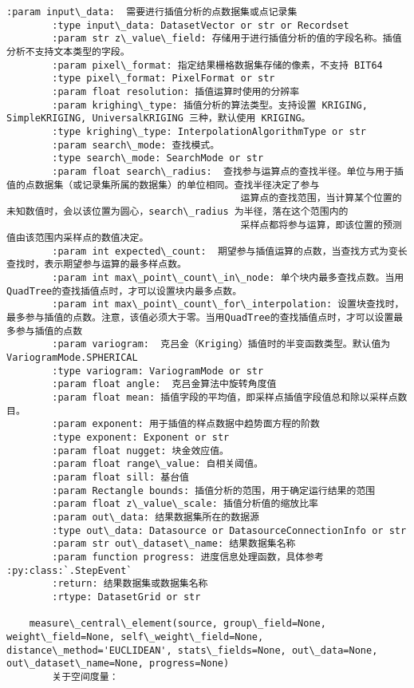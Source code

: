 \documentclass[11pt]{article}
\begin{document}
\begin{Verbatim}[commandchars=\\\{\}]
        :param input\_data:  需要进行插值分析的点数据集或点记录集
        :type input\_data: DatasetVector or str or Recordset
        :param str z\_value\_field: 存储用于进行插值分析的值的字段名称。插值分析不支持文本类型的字段。
        :param pixel\_format: 指定结果栅格数据集存储的像素，不支持 BIT64
        :type pixel\_format: PixelFormat or str
        :param float resolution: 插值运算时使用的分辨率
        :param krighing\_type: 插值分析的算法类型。支持设置 KRIGING, SimpleKRIGING, UniversalKRIGING 三种，默认使用 KRIGING。
        :type krighing\_type: InterpolationAlgorithmType or str
        :param search\_mode: 查找模式。
        :type search\_mode: SearchMode or str
        :param float search\_radius:  查找参与运算点的查找半径。单位与用于插值的点数据集（或记录集所属的数据集）的单位相同。查找半径决定了参与
                                         运算点的查找范围，当计算某个位置的未知数值时，会以该位置为圆心，search\_radius 为半径，落在这个范围内的
                                         采样点都将参与运算，即该位置的预测值由该范围内采样点的数值决定。
        :param int expected\_count:  期望参与插值运算的点数，当查找方式为变长查找时，表示期望参与运算的最多样点数。
        :param int max\_point\_count\_in\_node: 单个块内最多查找点数。当用QuadTree的查找插值点时，才可以设置块内最多点数。
        :param int max\_point\_count\_for\_interpolation: 设置块查找时，最多参与插值的点数。注意，该值必须大于零。当用QuadTree的查找插值点时，才可以设置最多参与插值的点数
        :param variogram:  克吕金（Kriging）插值时的半变函数类型。默认值为 VariogramMode.SPHERICAL
        :type variogram: VariogramMode or str
        :param float angle:  克吕金算法中旋转角度值
        :param float mean: 插值字段的平均值，即采样点插值字段值总和除以采样点数目。
        :param exponent: 用于插值的样点数据中趋势面方程的阶数
        :type exponent: Exponent or str
        :param float nugget: 块金效应值。
        :param float range\_value: 自相关阈值。
        :param float sill: 基台值
        :param Rectangle bounds: 插值分析的范围，用于确定运行结果的范围
        :param float z\_value\_scale: 插值分析值的缩放比率
        :param out\_data: 结果数据集所在的数据源
        :type out\_data: Datasource or DatasourceConnectionInfo or str
        :param str out\_dataset\_name: 结果数据集名称
        :param function progress: 进度信息处理函数，具体参考 :py:class:`.StepEvent`
        :return: 结果数据集或数据集名称
        :rtype: DatasetGrid or str
    
    measure\_central\_element(source, group\_field=None, weight\_field=None, self\_weight\_field=None, distance\_method='EUCLIDEAN', stats\_fields=None, out\_data=None, out\_dataset\_name=None, progress=None)
        关于空间度量：
        

\end{Verbatim}
\end{document}
